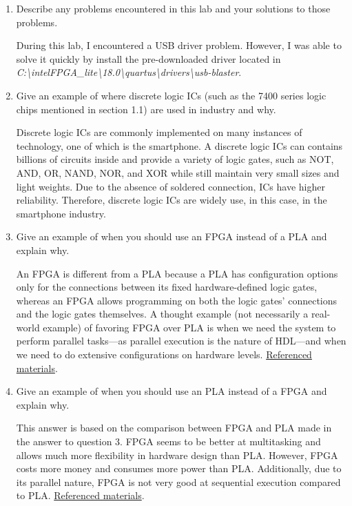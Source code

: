\documentclass[12pt]{article}
\begin{document}
\begin{enumerate}
    \item Describe any problems encountered in this lab and your solutions to those problems.

    During this lab, I encountered a USB driver problem. However, I was able to solve it quickly by install the pre-downloaded driver located in \textit{C:\textbackslash{}intelFPGA\_lite\textbackslash{}18.0\textbackslash{}quartus\textbackslash{}drivers\textbackslash{}usb-blaster}.

    \item Give an example of where discrete logic ICs (such as the 7400 series logic chips mentioned in section 1.1) are used in industry and why.

    Discrete logic ICs are commonly implemented on many instances of technology, one of which is the smartphone. A discrete logic ICs can contains billions of circuits inside and provide a variety of logic gates, such as NOT, AND, OR, NAND, NOR, and XOR while still maintain very small sizes and light weights. Due to the absence of soldered connection, ICs have higher reliability. Therefore, discrete logic ICs are widely use, in this case, in the smartphone industry.

    \item Give an example of when you should use an FPGA instead of a PLA and explain why.

    An FPGA is different from a PLA because a PLA has configuration options only for the connections between its fixed hardware-defined logic gates, whereas an FPGA allows programming on both the logic gates' connections and the logic gates themselves. A thought example (not necessarily a real-world example) of favoring FPGA over PLA is when we need the system to perform parallel tasks---as parallel execution is the nature of HDL---and when we need to do extensive configurations on hardware levels. \href{https://electronics.stackexchange.com/a/4393/97402}{Referenced materials}.

    \item Give an example of when you should use an PLA instead of a FPGA and explain why.

    This answer is based on the comparison between FPGA and PLA made in the answer to question 3. FPGA seems to be better at multitasking and allows much more flexibility in hardware design than PLA. However, FPGA costs more money and consumes more power than PLA. Additionally, due to its parallel nature, FPGA is not very good at sequential execution compared to PLA. \href{https://www.viewpointusa.com/industrial-embedded/when-is-an-fpga-worth-it-and-when-is-it-not-when-developing-an-industrial-embedded-system/}{Referenced materials}.


\end{enumerate}
\end{document}
